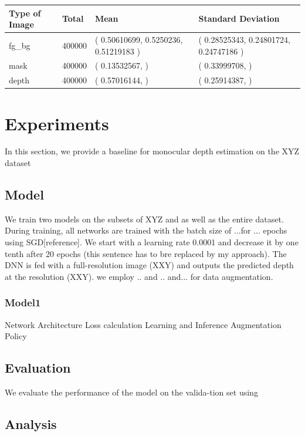 \documentclass{article}
\begin{document}
\begin{table}[]
\begin{tabular}{|l|l|l|l|}
\hline
Type of Image & Total  & Mean                                  & Standard Deviation                     \\ \hline
fg\_bg        & 400000 & ( 0.50610699, 0.5250236, 0.51219183 ) & ( 0.28525343, 0.24801724, 0.24747186 ) \\ \hline
mask          & 400000 & ( 0.13532567, )                       & ( 0.33999708, )                        \\ \hline
depth         & 400000 & ( 0.57016144, )                       & ( 0.25914387, )                        \\ \hline
\end{tabular}
\end{table}

\section{Experiments}
In this section, we provide a baseline for monocular depth estimation on the XYZ dataset
\subsection{Model}
We train two models on the subsets of XYZ and as well as the entire dataset. During training, all networks are trained with the batch size of ...for ... epochs using SGD[reference]. We start with a learning rate 0.0001 and decrease it by one tenth after 20 epochs (this sentence has to bre replaced by my approach). The DNN is fed with a full-resolution image (XXY) and outputs the predicted depth at the resolution (XXY). we employ .. and .. and... for data augmentation.

\subsubsection{Model1}
Network Architecture
Loss calculation
Learning and Inference
Augmentation Policy
\subsection{Evaluation}

We evaluate the performance of the model on the valida-tion set using
\subsection{Analysis}
\end{document}
